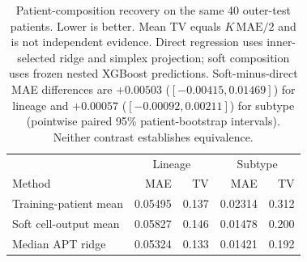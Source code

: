 \begin{table}[t]
\centering\small
\begin{tabular}{lrrrr}
\toprule
& \multicolumn{2}{c}{Lineage} & \multicolumn{2}{c}{Subtype} \\
Method & MAE & TV & MAE & TV \\
\midrule
Training-patient mean & 0.05495 & 0.137 & 0.02314 & 0.312 \\
Soft cell-output mean & 0.05827 & 0.146 & 0.01478 & 0.200 \\
Median APT ridge & 0.05324 & 0.133 & 0.01421 & 0.192 \\
\bottomrule
\end{tabular}
\caption{Patient-composition recovery on the same 40 outer-test patients.
Lower is better. Mean TV equals $K\,\mathrm{MAE}/2$ and is not independent
evidence. Direct regression uses inner-selected ridge and simplex projection;
soft composition uses frozen nested XGBoost predictions. Soft-minus-direct
MAE differences are $+0.00503$ ($[-0.00415,0.01469]$) for lineage and
$+0.00057$ ($[-0.00092,0.00211]$) for subtype (pointwise paired 95\%
patient-bootstrap intervals). Neither contrast establishes equivalence.}
\label{tab:direct_composition}
\end{table}
